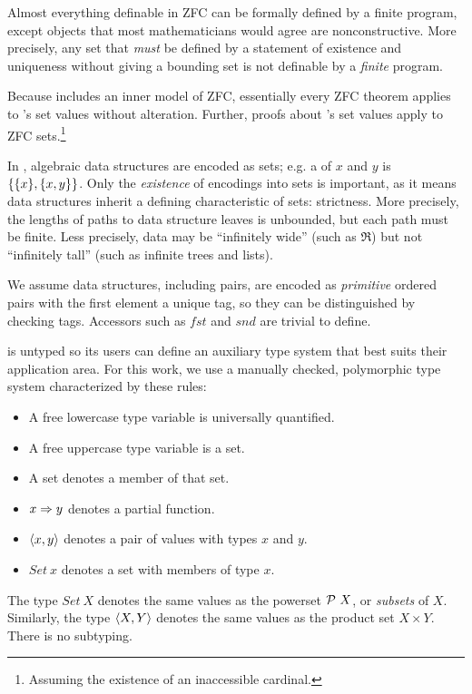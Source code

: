 \documentclass[preprint]{sigplanconf}
\begin{document}
Almost everything definable in ZFC can be formally defined by a finite \lzfclang program, except objects that most mathematicians would agree are nonconstructive.
More precisely, any set that \emph{must} be defined by a statement of existence and uniqueness without giving a bounding set is not definable by a \emph{finite} \lzfclang program.

Because \lzfclang includes an inner model of ZFC, essentially every ZFC theorem applies to \lzfclang's set values without alteration.
Further, proofs about \lzfclang's set values apply to ZFC sets.\footnote{Assuming the existence of an inaccessible cardinal.}

In \lzfclang, algebraic data structures are encoded as sets; e.g. a  of $x$ and $y$ is $\{{\{{x}\},\{{x,y}\}}\}$.
Only the \emph{existence} of encodings into sets is important, as it means data structures inherit a defining characteristic of sets: strictness.
More precisely, the lengths of paths to data structure leaves is unbounded, but each path must be finite.
Less precisely, data may be ``infinitely wide'' (such as $\Re$) but not ``infinitely tall'' (such as infinite trees and lists).

We assume data structures, including pairs, are encoded as \emph{primitive} ordered pairs with the first element a unique tag, so they can be distinguished by checking tags.
Accessors such as $fst$ and $snd$ are trivial to define.

\lzfclang is untyped so its users can define an auxiliary type system that best suits their application area.
For this work, we use a manually checked, polymorphic type system characterized by these rules:
\begin{itemize}
	\item A free lowercase type variable is universally quantified.
	\item A free uppercase type variable is a set.
	\item A set denotes a member of that set.
	\item $x \Rightarrow y$ denotes a partial function.
	\item $\langle{x,y}\rangle$ denotes a pair of values with types $x$ and $y$.
	\item $Set~x$ denotes a set with members of type $x$.
\end{itemize}
The type $Set~X$ denotes the same values as the powerset $\mathcal{P}~X$, or \emph{subsets} of $X$.
Similarly, the type $\langle{X,Y}\rangle$ denotes the same values as the product set $X \times Y$.
There is no subtyping.
\end{document}
